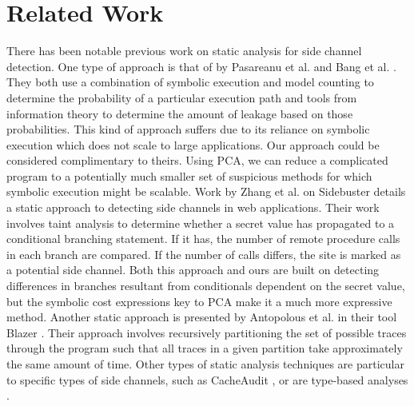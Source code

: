 \section{Related Work}

There has been notable previous work on static analysis for side channel detection. One type of approach is that of by Pasareanu et al. \cite{smtmulti} and Bang et al. \cite{BAQ16}. They both use a combination of symbolic execution and model counting to determine the probability of a particular execution path and tools from information theory to determine the amount of leakage based on those probabilities. This kind of approach suffers due to its reliance on symbolic execution which does not scale to large applications. Our approach could be considered complimentary to theirs. Using PCA, we can reduce a complicated program to a potentially much smaller set of suspicious methods for which symbolic execution might be scalable. Work by Zhang et al. on Sidebuster \cite{sidebuster} details a static approach to detecting side channels in web applications. Their work involves taint analysis to determine whether a secret value has propagated to a conditional branching statement. If it has, the number of remote procedure calls in each branch are compared. If the number of calls differs, the site is marked as a potential side channel. Both this approach and ours are built on detecting differences in branches resultant from conditionals dependent on the secret value, but the symbolic cost expressions key to PCA make it a much more expressive method. Another static approach is presented by Antopolous et al. in their tool Blazer \cite{decomposition}. Their approach involves recursively partitioning the set of possible traces through the program such that all traces in a given partition take approximately the same amount of time. Other types of static analysis techniques are particular to specific types of side channels, such as CacheAudit \cite{cacheaudit}, or are type-based analyses \cite{fixbyconstant,hedin}.

